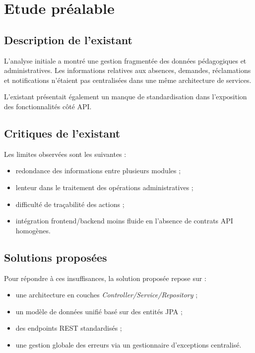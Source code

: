 \chapter{Etude préalable}

\section{Description de l'existant}
L'analyse initiale a montré une gestion fragmentée des données pédagogiques et administratives. Les informations relatives aux absences, demandes, réclamations et notifications n'étaient pas centralisées dans une même architecture de services.

L'existant présentait également un manque de standardisation dans l'exposition des fonctionnalités côté API.

\section{Critiques de l'existant}
Les limites observées sont les suivantes :
\begin{itemize}
	\item redondance des informations entre plusieurs modules ;
	\item lenteur dans le traitement des opérations administratives ;
	\item difficulté de traçabilité des actions ;
	\item intégration frontend/backend moins fluide en l'absence de contrats API homogènes.
\end{itemize}

\section{Solutions proposées}
Pour répondre à ces insuffisances, la solution proposée repose sur :
\begin{itemize}
	\item une architecture en couches \textit{Controller/Service/Repository} ;
	\item un modèle de données unifié basé sur des entités JPA ;
	\item des endpoints REST standardisés ;
	\item une gestion globale des erreurs via un gestionnaire d'exceptions centralisé.
\end{itemize}

